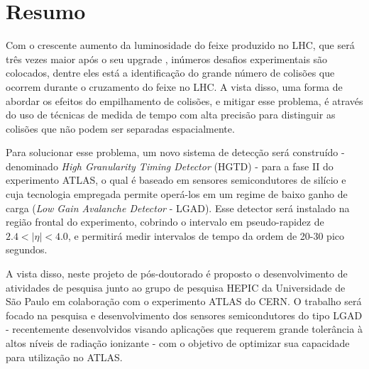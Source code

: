 \chapter*{Resumo}


Com o crescente aumento da luminosidade do feixe produzido no LHC, que será três vezes maior após o seu upgrade \cite{tdr}, inúmeros desafios experimentais são colocados, dentre eles está a identificação do grande número de colisões que ocorrem durante o cruzamento do feixe no LHC. A vista disso, uma forma de abordar os efeitos do empilhamento de colisões, e mitigar esse problema, é através do uso de técnicas de medida de tempo com alta precisão para distinguir as colisões que não podem ser separadas espacialmente. 

Para solucionar esse problema, um novo sistema de detecção será construído - denominado {\it High Granularity Timing Detector} (HGTD) - para a fase II do experimento ATLAS, o qual é baseado em sensores semicondutores de silício e cuja tecnologia empregada permite operá-los em um regime de baixo ganho de carga ({\it Low Gain Avalanche Detector} - LGAD). Esse detector será instalado na região frontal do experimento, cobrindo o intervalo em pseudo-rapidez de $2.4< |\eta| <4.0$, e permitirá medir intervalos de tempo da ordem de 20-30 pico segundos.


A vista disso, neste projeto de pós-doutorado é proposto o desenvolvimento de atividades de pesquisa junto ao grupo de pesquisa HEPIC da Universidade de São Paulo em colaboração com o experimento ATLAS do CERN. O trabalho será focado na pesquisa e desenvolvimento dos sensores semicondutores do tipo LGAD - recentemente desenvolvidos visando aplicações que requerem grande tolerância à altos níveis de radiação ionizante \cite{JIN_LGAD,NIMA_LGAD} - com o objetivo de optimizar sua capacidade para utilização no ATLAS. %


